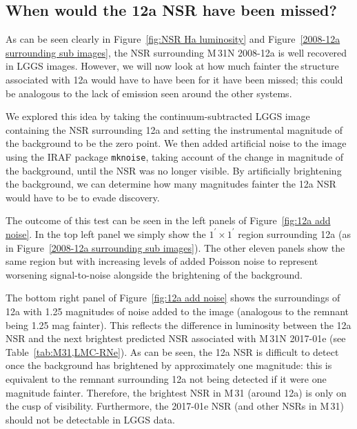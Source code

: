 \documentclass[fleqn,usenatbib]{mnras}
\begin{document}
\subsection{When would the 12a NSR have been missed?}\label{sec:Add noise 12a NSR}
As can be seen clearly in Figure~\ref{fig:NSR Ha luminosity} and Figure~\ref{2008-12a surrounding sub images}, the NSR surrounding M\,31N 2008-12a is well recovered in LGGS images. However, we will now look at how much fainter the structure associated with 12a would have to have been for it have been missed; this could be analogous to the lack of emission seen around the other systems.

We explored this idea by taking the continuum-subtracted LGGS image containing the NSR surrounding 12a and setting the instrumental magnitude of the background to be the zero point. We then added artificial noise to the image using the IRAF package \texttt{mknoise}, taking account of the change in magnitude of the background, until the NSR was no longer visible. By artificially brightening the background, we can determine how many magnitudes fainter the 12a NSR would have to be to evade discovery.

The outcome of this test can be seen in the left panels of Figure~\ref{fig:12a add noise}. In the top left panel we simply show the $1^{\prime} \times 1^{\prime}$ region surrounding 12a (as in Figure~\ref{2008-12a surrounding sub images}). The other eleven panels show the same region but with increasing levels of added Poisson noise to represent worsening signal-to-noise alongside the brightening of the background.

The bottom right panel of Figure~\ref{fig:12a add noise} shows the surroundings of 12a with 1.25 magnitudes of noise added to the image (analogous to the remnant being 1.25 mag fainter). This reflects the difference in luminosity between the 12a NSR and the next brightest predicted NSR associated with M\,31N 2017-01e (see Table~\ref{tab:M31,LMC-RNe}). As can be seen, the 12a NSR is difficult to detect once the background has brightened by approximately one magnitude: this is equivalent to the remnant surrounding 12a not being detected if it were one magnitude fainter. Therefore, the brightest NSR in M\,31 (around 12a) is only on the cusp of visibility. Furthermore, the 2017-01e NSR (and other NSRs in M\,31) should not be detectable in LGGS data.
\end{document}
